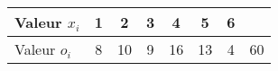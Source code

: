 \documentclass{standalone}
\begin{document}
\begin{tabular}{l|c|c|c|c|c|c|c}
	Valeur $x_i$ & 1 & 2 & 3 & 4 & 5 & 6 &\\ \hline Valeur $o_i$ & 8 &
	10 & 9 & 16 & 13 & 4 & 60
\end{tabular}
\end{document}
